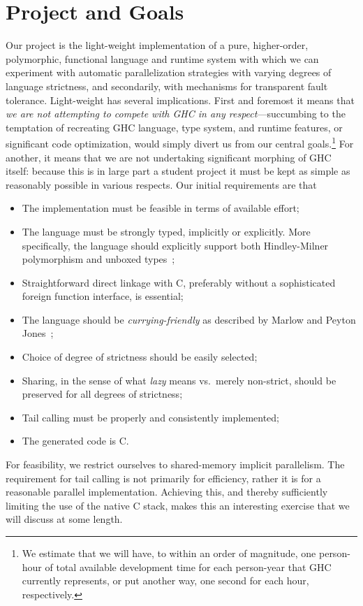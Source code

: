 \documentclass{llncs}
\begin{document}
\section{Project and Goals}
Our project is the light-weight implementation of a pure, higher-order,
polymorphic, functional language and runtime system with which we can
experiment with automatic parallelization strategies with varying degrees of
language strictness, and secondarily, with mechanisms for transparent fault
tolerance.  Light-weight has several implications.  First and foremost it
means that \emph{we are not attempting to compete with GHC in any
  respect}---succumbing to the temptation of recreating GHC language, type
system, and runtime features, or significant code optimization, would simply
divert us from our central goals.\footnote{We estimate that we will have, to
  within an order of magnitude, one person-hour of total available development
  time for each person-year that GHC currently represents, or put another way,
  one second for each hour, respectively.}  For another, it means that we are
not undertaking significant morphing of GHC itself: because this is in large
part a student project it must be kept as simple as reasonably possible in
various respects.  Our initial requirements are that
\begin{itemize}
\item The implementation must be feasible in terms of available effort;
\item The language must be strongly typed, implicitly or explicitly.  More
  specifically, the language should explicitly support both Hindley-Milner
  polymorphism and unboxed types~\cite{Jones:1991};
\item Straightforward direct linkage with C, preferably without a sophisticated
  foreign function interface, is essential;
  \item The language should be \emph{currying-friendly} as described by Marlow
and Peyton Jones~\cite{Marlow:2004};
\item Choice of degree of strictness should be easily selected;
\item Sharing, in the sense of what \emph{lazy} means vs.\ merely non-strict,
  should be preserved for all degrees of strictness;
\item Tail calling must be properly and consistently implemented;
\item The generated code is C.
\end{itemize}

For feasibility, we restrict ourselves to shared-memory implicit parallelism.
The requirement for tail calling is not primarily for efficiency, rather it
is for a reasonable parallel implementation.  Achieving this, and thereby
sufficiently limiting the use of the native C stack, makes this an interesting
exercise that we will discuss at some length.
\end{document}
